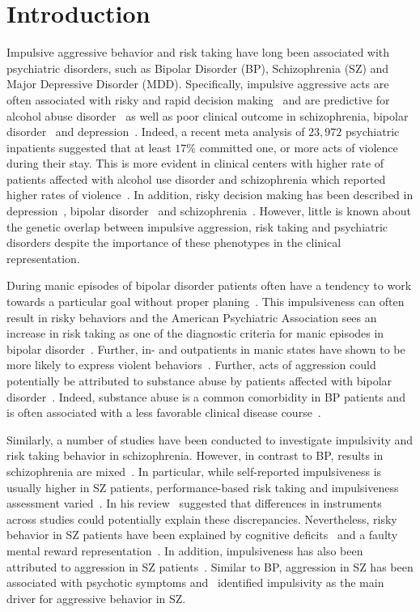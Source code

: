 \section{Introduction}
\label{sec:uk_biobank_psych_introduction}

Impulsive aggressive behavior and risk taking have long been associated with psychiatric disorders, such as Bipolar Disorder (BP), Schizophrenia (SZ) and Major Depressive Disorder (MDD).
Specifically, impulsive aggressive acts are often associated with risky and rapid decision making~\cite{Moeller2001} and are predictive for alcohol abuse disorder~\cite{Courtney2012} as well as poor clinical outcome in schizophrenia, bipolar disorder~\cite{Gut-Fayand2001} and depression~\cite{Dutton2013}.
Indeed, a recent meta analysis of $23,972$ psychiatric inpatients suggested that at least $17\%$ committed one, or more acts of violence during their stay.
This is more evident in clinical centers with higher rate of patients affected with alcohol use disorder and schizophrenia which reported higher rates of violence~\cite{Iozzino2015}. 
In addition, risky decision making has been described in depression~\cite{Wilson2010}, bipolar disorder~\cite{Johnson2012} and schizophrenia~\cite{Cheng2012}.
However, little is known about the genetic overlap between impulsive aggression, risk taking and psychiatric disorders despite the importance of these phenotypes in the clinical representation.

During manic episodes of bipolar disorder patients often have a tendency to work towards a particular goal without proper planing~\cite{Johnson2012}.
This impulsiveness can often result in risky behaviors and the American Psychiatric Association sees an increase in risk taking as one of the diagnostic criteria for manic episodes in bipolar disorder~\cite{APA1994,AmericanPsychiatricAssociation2013}.
Further, in- and outpatients in manic states have shown to be more likely to express violent behaviors~\cite{Ballester2012}.
Further, acts of aggression could potentially be attributed to substance abuse by patients affected with bipolar disorder~\cite{Fazel2010}.
Indeed, substance abuse is a common comorbidity in BP patients and is often associated with a less favorable clinical disease course~\cite{Cassidy2001}.

Similarly, a number of studies have been conducted to investigate impulsivity and risk taking behavior in schizophrenia.
However, in contrast to BP, results in schizophrenia are mixed~\cite{Reddy2014}.
In particular, while self-reported impulsiveness is usually higher in SZ patients, performance-based risk taking and impulsiveness assessment varied~\cite{Ouzir2013}.
In his review~\citet{Ouzir2013} suggested that differences in instruments across studies could potentially explain these discrepancies.
Nevertheless, risky behavior in SZ patients have been explained by cognitive deficits~\cite{Cheng2012} and a faulty mental reward representation~\cite{Heerey2011}.
In addition, impulsiveness has also been attributed to aggression in SZ patients~\cite{Hoptman2015}.
Similar to BP, aggression in SZ has been associated with psychotic symptoms and~\citet{Hoptman2015} identified impulsivity as the main driver for aggressive behavior in SZ\@.


